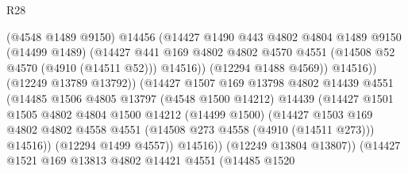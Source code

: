 \begin{lexlean}{R28}
\begin{coremodule}
                                  (@4548 @1489 @9150)
                                  @14456
                                  (@14427
                                    @1490
                                    @443
                                    @4802
                                    @4804
                                    @1489
                                    @9150
                                    (@14499 @1489)
                                    (@14427
                                      @441
                                      @169
                                      @4802
                                      @4802
                                      @4570
                                      @4551
                                      (@14508 @52 @4570 (@4910 (@14511 @52)))
                                      @14516))
                                  (@12294 @1488 @4569))
                                @14516))
                            (@12249 @13789 @13792))
                          (@14427
                            @1507
                            @169
                            @13798
                            @4802
                            @14439
                            @4551
                            (@14485
                              @1506
                              @4805
                              @13797
                              (@4548 @1500 @14212)
                              @14439
                              (@14427
                                @1501
                                @1505
                                @4802
                                @4804
                                @1500
                                @14212
                                (@14499 @1500)
                                (@14427
                                  @1503
                                  @169
                                  @4802
                                  @4802
                                  @4558
                                  @4551
                                  (@14508 @273 @4558 (@4910 (@14511 @273)))
                                  @14516))
                              (@12294 @1499 @4557))
                            @14516))
                        (@12249 @13804 @13807))
                      (@14427
                        @1521
                        @169
                        @13813
                        @4802
                        @14421
                        @4551
                        (@14485
                          @1520

\end{coremodule}
\end{lexlean}
